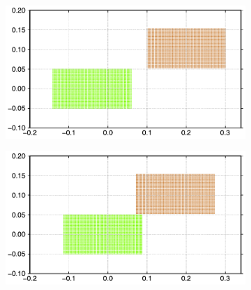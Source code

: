 \begin{figure}[!htpb]
  \centering
  \begin{subfigure}{0.48\textwidth}
    \centering
    \includegraphics[width=1.0\textwidth]{figures/csph/figures/dinesh_2022_elastic_solids_passing_by/Mohseni_Vyas/time0}
    \label{fig:passing-0}
  \end{subfigure}
  \begin{subfigure}{0.48\textwidth}
    \centering
    \includegraphics[width=1.0\textwidth]{figures/csph/figures/dinesh_2022_elastic_solids_passing_by/Mohseni_Vyas/time1}
    \label{fig:passing-1}
  \end{subfigure}


\end{figure}
